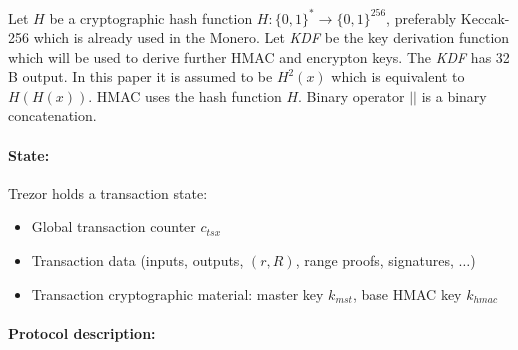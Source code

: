 \documentclass[]{article}
\begin{document}
Let $H$ be a cryptographic hash function $H : \{0,1\}^* \rightarrow \{0,1\}^{256}$, preferably Keccak-256 which is already used in the Monero. Let \emph{KDF} be the key derivation function which will be used to derive further HMAC and encrypton keys. The \emph{KDF} has 32 B output. In this paper it is assumed to be $H^2(x)$ which is equivalent to $H(H(x))$. HMAC uses the hash function $H$. Binary operator $||$ is a binary concatenation.

\paragraph{State:}
Trezor holds a transaction state:
\begin{itemize}
	\item Global transaction counter $c_{tsx}$
	\item Transaction data (inputs, outputs, $(r,R)$, range proofs, signatures, $\dots$)
	\item Transaction cryptographic material: master key $k_{mst}$, base HMAC key $k_{hmac}$
\end{itemize}

\paragraph{Protocol description:}
\end{document}
